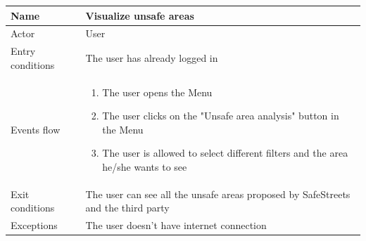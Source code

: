 \documentclass{article}
\begin{document}
\begin{table}[H]
    \begin{tabular}{|l|l|}
    \hline
    Name & \begin{minipage}[t]{0.7\textwidth} \textbf{Visualize unsafe areas} \end{minipage} \\ \hline  
    Actor & \begin{minipage}[t]{0.7\textwidth} User \end{minipage} \\ \hline 
    Entry conditions & \begin{minipage}[t]{0.7\textwidth} The user has already
    logged in\end{minipage} \\
    \hline 
    Events flow & \begin{minipage}[t]{0.7\textwidth} 
    \begin{enumerate}
        \item The user opens the Menu
        \item The user clicks on the "Unsafe area analysis" button in the Menu
        \item The user is allowed to select different filters and the area
        he/she wants to see
    \end{enumerate}
    \end{minipage} \\ \hline
    Exit conditions & \begin{minipage}[t]{0.7\textwidth} The user can see all
    the unsafe areas proposed by SafeStreets and the third party\end{minipage}
    \\
    \hline
    Exceptions & \begin{minipage}[t]{0.7\textwidth}  The user doesn't have
    internet connection \end{minipage} \\ \hline
    \end{tabular}
\end{table}
\end{document}
